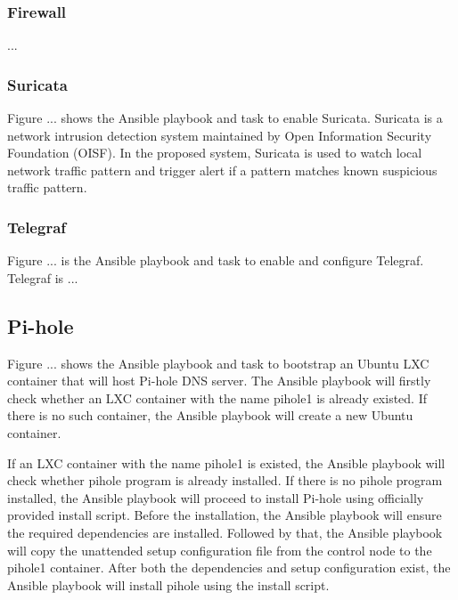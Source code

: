 \documentclass[../index.tex]{subfiles}
\begin{document}
\subsubsection{Firewall}

...

\subsubsection{Suricata}

Figure ... shows the Ansible playbook and task to enable Suricata. Suricata is a network intrusion
detection system maintained by Open Information Security Foundation (OISF). In the proposed system,
Suricata is used to watch local network traffic pattern and trigger alert if a pattern matches known
suspicious traffic pattern.

\subsubsection{Telegraf}

Figure ... is the Ansible playbook and task to enable and configure Telegraf. Telegraf is ...

\subsection{Pi-hole}




Figure ... shows the Ansible playbook and task to bootstrap an Ubuntu LXC container that will host
Pi-hole DNS server. The Ansible playbook will firstly check whether an LXC container with the name
pihole1 is already existed. If there is no such container, the Ansible playbook will create a new
Ubuntu container.

If an LXC container with the name pihole1 is existed, the Ansible playbook will check whether pihole
program is already installed. If there is no pihole program installed, the Ansible playbook will
proceed to install Pi-hole using officially provided install script. Before the installation, the
Ansible playbook will ensure the required dependencies are installed. Followed by that, the Ansible
playbook will copy the unattended setup configuration file from the control node to the pihole1
container. After both the dependencies and setup configuration exist, the Ansible playbook will
install pihole using the install script.
\end{document}
